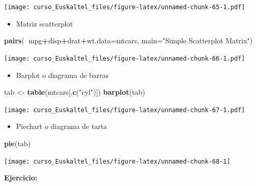 \documentclass[]{book}
\newenvironment{Shaded}{\begin{snugshade}}{\end{snugshade}}
\newcommand{\KeywordTok}[1]{\textcolor[rgb]{0.13,0.29,0.53}{\textbf{#1}}}
\newcommand{\DataTypeTok}[1]{\textcolor[rgb]{0.13,0.29,0.53}{#1}}
\newcommand{\StringTok}[1]{\textcolor[rgb]{0.31,0.60,0.02}{#1}}
\newcommand{\OperatorTok}[1]{\textcolor[rgb]{0.81,0.36,0.00}{\textbf{#1}}}
\newcommand{\NormalTok}[1]{#1}
\providecommand{\tightlist}{%
  \setlength{\itemsep}{0pt}\setlength{\parskip}{0pt}}
\begin{document}
\texttt{[image: curso\_Euskaltel\_files/figure-latex/unnamed-chunk-65-1.pdf]}

\begin{itemize}
\tightlist
\item
  Matriz scatterplot
\end{itemize}

\begin{Shaded}
\begin{Highlighting}[]
\KeywordTok{pairs}\NormalTok{(}\OperatorTok{~}\NormalTok{mpg}\OperatorTok{+}\NormalTok{disp}\OperatorTok{+}\NormalTok{drat}\OperatorTok{+}\NormalTok{wt,}\DataTypeTok{data=}\NormalTok{mtcars,}
   \DataTypeTok{main=}\StringTok{"Simple Scatterplot Matrix"}\NormalTok{)}
\end{Highlighting}
\end{Shaded}

\texttt{[image: curso\_Euskaltel\_files/figure-latex/unnamed-chunk-66-1.pdf]}

\begin{itemize}
\tightlist
\item
  Barplot o diagrama de barras
\end{itemize}

\begin{Shaded}
\begin{Highlighting}[]
\NormalTok{tab <-}\StringTok{ }\KeywordTok{table}\NormalTok{(mtcars[,}\KeywordTok{c}\NormalTok{(}\StringTok{"cyl"}\NormalTok{)])}
\KeywordTok{barplot}\NormalTok{(tab)}
\end{Highlighting}
\end{Shaded}

\texttt{[image: curso\_Euskaltel\_files/figure-latex/unnamed-chunk-67-1.pdf]}

\begin{itemize}
\tightlist
\item
  Piechart o diagrama de tarta
\end{itemize}

\begin{Shaded}
\begin{Highlighting}[]
\KeywordTok{pie}\NormalTok{(tab)}
\end{Highlighting}
\end{Shaded}

\begin{center}\texttt{[image: curso\_Euskaltel\_files/figure-latex/unnamed-chunk-68-1]} \end{center}

\textbf{Ejercicio:}
\end{document}
